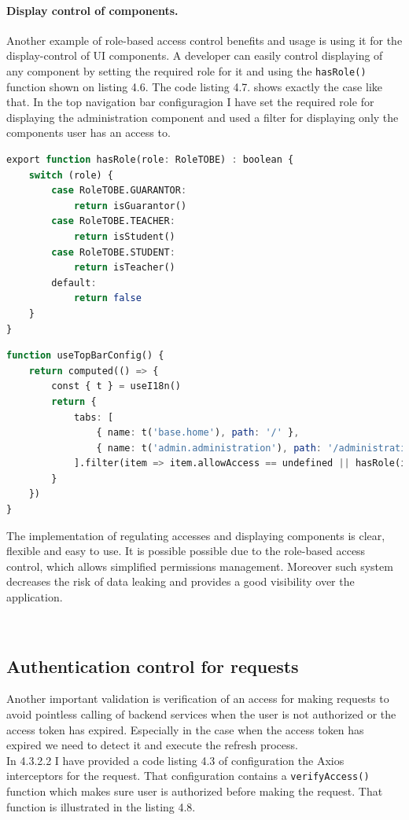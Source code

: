 \paragraph*{Display control of components.} Another example of role-based access control benefits and usage is using it for the display-control of UI components. A developer can easily control displaying of any component by setting the required role for it and using the \texttt{hasRole()} function shown on listing 4.6. The code listing 4.7. shows exactly the case like that. In the top navigation bar configuragion I have set the required role for displaying the administration component and used a filter for displaying only the components user has an access to.

\begin{lstlisting}[language=Octave, caption=The example of component configuration in Router]
export function hasRole(role: RoleTOBE) : boolean {
    switch (role) {
        case RoleTOBE.GUARANTOR:
            return isGuarantor()
        case RoleTOBE.TEACHER:
            return isStudent()
        case RoleTOBE.STUDENT:
            return isTeacher()
        default:
            return false
    }
}
\end{lstlisting}


\begin{lstlisting}[language=Octave, caption=The example of component configuration in Router]
function useTopBarConfig() {
    return computed(() => {
        const { t } = useI18n()
        return {
            tabs: [
                { name: t('base.home'), path: '/' },
                { name: t('admin.administration'), path: '/administration' , allowAccess: Role.GUARANTOR },
            ].filter(item => item.allowAccess == undefined || hasRole(item.allowAccess))
        }
    })
}
\end{lstlisting}



\noindent The implementation of regulating accesses and displaying components is clear, flexible and easy to use. It is possible possible due to the role-based access control, which allows simplified permissions management. Moreover such system decreases the risk of data leaking and provides a good visibility over the application.


\

\subsection{Authentication control for requests} Another important validation is verification of an access for making requests to avoid pointless calling of backend services when the user is not authorized or the access token has expired. Especially in the case when the access token has expired we need to detect it and execute the refresh process.\\
In 4.3.2.2 I have provided a code listing 4.3 of configuration the Axios interceptors for the request. That configuration contains a \texttt{verifyAccess()} function which makes sure user is authorized before making the request. That function is illustrated in the listing 4.8.\\


